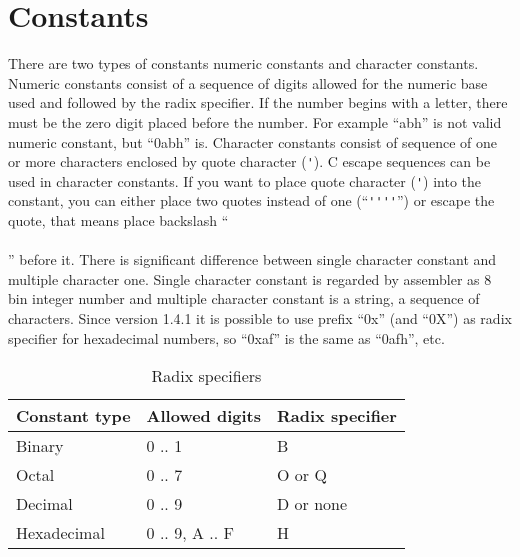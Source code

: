 \documentclass[a4paper,twoside,12pt]{book}
\newcommand{\mysmallfont}{\fontsize{8pt}{10pt} \selectfont{}}
\begin{document}
	\section{Constants}
		There are two types of constants numeric constants and character constants.
     Numeric constants consist of a sequence of digits allowed for the numeric
      base used and followed by the radix specifier. If the number begins with
       a letter, there must be the zero digit placed before the number.
        For example ``abh'' is not valid numeric constant, but ``0abh'' is.
         Character constants consist of sequence of one or more characters enclosed
          by quote character (\verb"'"). C escape sequences can be used in character
           constants. If you want to place quote character (\verb"'") into the constant,
            you can either place two quotes instead of one (``\verb"''''"'') or escape the quote,
             that means place backslash ``\\\\'' before it. There is significant difference between
              single character constant and multiple character one. Single character constant is
               regarded by assembler as 8 bin integer number and multiple character constant is
                a string, a sequence of characters. Since version 1.4.1 it is possible to use
                 prefix ``0x'' (and ``0X'') as radix specifier for hexadecimal numbers, so
                  ``0xaf'' is the same as ``0afh'', etc.

		\begin{table}[h!]
			\mysmallfont{}
			\centering{}
			\begin{tabular}{|l|l|l|}
				\hline
				Constant type	& Allowed digits	& Radix specifier	\\
				\hline
				Binary		& 0 .. 1		& B		\\
				Octal		& 0 .. 7		& O or Q	\\
				Decimal		& 0 .. 9		& D or none	\\
				Hexadecimal	& 0 .. 9, A .. F	& H		\\
				\hline
			\end{tabular}
			\caption{Radix specifiers}
		\end{table}
\end{document}
